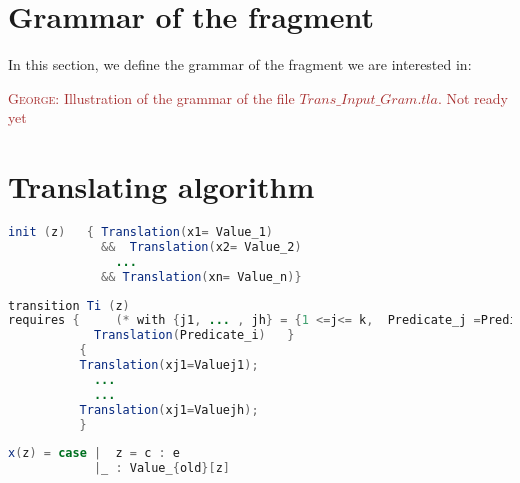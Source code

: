 \documentclass{article}
\newlength{\MMtextNodeWidth}
\newcommand{\MMsetTextNodeWidth}[1]{%
  \settowidth{\MMtextNodeWidth}{#1}%
}
\theoremstyle{plain}
\numberwithin{equation}{section}
\newcommand{\george}[1]{\textcolor{brown}{\textsc{George: } {\sf #1}}}
\begin{document}
\section{Grammar of the fragment } \label{Grammar}
In this section, we define the grammar of the fragment we are interested in: 


\large
\MMsetTextNodeWidth{99}

\george{Illustration of the grammar of the file $Trans\_Input\_Gram.tla$. Not ready yet}




\section{Translating algorithm} 

\begin{lrbox}{\codebox}
   \begin{lstlisting}[language=java]
init (z)   { Translation(x1= Value_1) 
             &&  Translation(x2= Value_2) 
               ... 
             && Translation(xn= Value_n)}
\end{lstlisting}
\end{lrbox}


\begin{lrbox}{\codeboxa}
   \begin{lstlisting}[language=java]
transition Ti (z)  
requires {     (* with {j1, ... , jh} = {1 <=j<= k,  Predicate_j =Predicate_i } a *)
            Translation(Predicate_i)   }
          {
          Translation(xj1=Valuej1);
            ... 
            ...
          Translation(xj1=Valuejh);
          }  
\end{lstlisting}
\end{lrbox}



\begin{lrbox}{\codeboxb}
   \begin{lstlisting}[language=java]
x(z) = case |  z = c : e 
            |_ : Value_{old}[z]

\end{lstlisting}
\end{lrbox}
\end{document}
